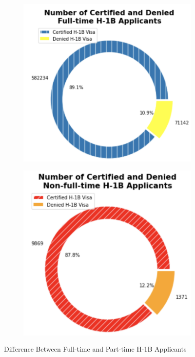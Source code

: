 \documentclass[conference]{IEEEtran}
\begin{document}
\begin{figure}[h]
     \begin{subfigure}[h]{0.2\textwidth}
         \centering
         \hbox{\hspace{0em}\includegraphics[scale = 0.3]{FT_Cert_Denied.png}}
     \end{subfigure}
     \hfill
     \begin{subfigure}[h]{0.2\textwidth}
         \centering
         \hbox{\hspace{-8em}\includegraphics[scale=0.3]{NFT_Cert_Denied.png}}
     \end{subfigure}
        \caption{Difference Between Full-time and Part-time H-1B Applicants}
        \label{Fig_ft_nft_2}
\end{figure}
\end{document}
